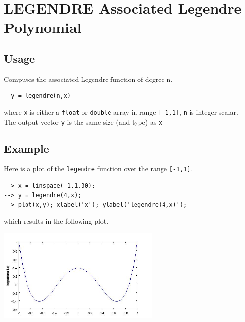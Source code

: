 \section{LEGENDRE Associated Legendre Polynomial}

\subsection{Usage}

Computes the associated Legendre function of degree n. 
\begin{verbatim}
  y = legendre(n,x)
\end{verbatim}
where \verb|x| is either a \verb|float| or \verb|double| array in range \verb|[-1,1]|, \verb|n| is integer scalar.  The output
vector \verb|y| is the same size (and type) as \verb|x|.
\subsection{Example}

Here is a plot of the \verb|legendre| function over the range \verb|[-1,1]|.
\begin{verbatim}
--> x = linspace(-1,1,30);
--> y = legendre(4,x);
--> plot(x,y); xlabel('x'); ylabel('legendre(4,x)');
\end{verbatim}
which results in the following plot.


\centerline{\includegraphics[width=8cm]{legendre}}

